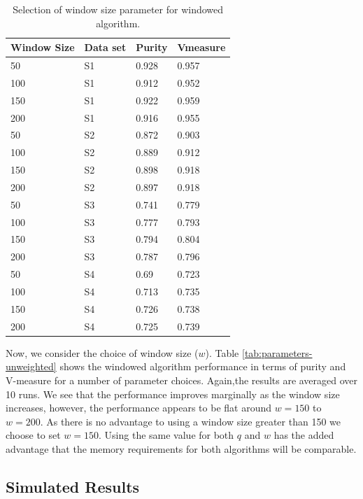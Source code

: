 \begin{table}[!h]
\centering
\caption{Selection of window size parameter for windowed algorithm.}
\label{tab:parameters-windowed}
\begin{tabular}{llll}
\hline
Window Size & Data set & Purity & Vmeasure \\ \hline
50   & S1      & 0.928  & 0.957    \\
100  & S1      & 0.912  & 0.952    \\
150  & S1      & 0.922  & 0.959    \\
200  & S1      & 0.916  & 0.955    \\ \hline
50   & S2      & 0.872  & 0.903    \\
100  & S2      & 0.889  & 0.912    \\
150  & S2      & 0.898  & 0.918    \\
200  & S2      & 0.897  & 0.918    \\ \hline
50   & S3      & 0.741  & 0.779    \\
100  & S3      & 0.777  & 0.793    \\
150  & S3      & 0.794  & 0.804    \\
200  & S3      & 0.787  & 0.796    \\ \hline
50   & S4      & 0.69   & 0.723    \\
100  & S4      & 0.713  & 0.735    \\
150  & S4      & 0.726  & 0.738    \\
200  & S4      & 0.725  & 0.739   \\ \hline
\end{tabular}
\end{table}
Now, we consider the choice of window size ($w$). Table \ref{tab:parameters-unweighted} shows the windowed algorithm performance in terms of purity and V-measure for a number of parameter choices. Again,the results are averaged over 10 runs. We see that the performance improves marginally as the window size increases, however, the performance appears to be flat around $w = 150$ to $w = 200$. As there is no advantage to using a window size greater than 150 we choose to set $w = 150$. Using the same value for both $q$ and $w$ has the added advantage that the memory requirements for both algorithms will be comparable. 
 \newpage
\subsection{Simulated Results}
\label{sec:simulated-results}

